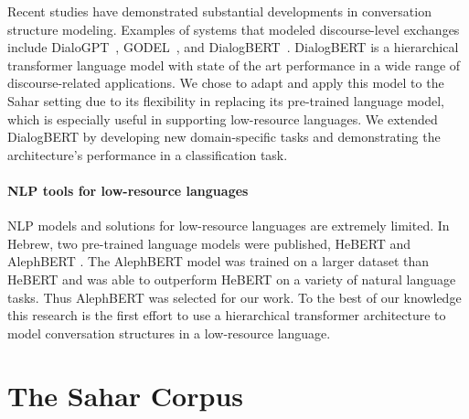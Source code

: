 \documentclass[letterpaper]{article} %
\begin{document}


Recent studies have  demonstrated substantial developments in  conversation structure modeling. Examples of systems that modeled discourse-level exchanges include DialoGPT~\cite{zhang2019dialogpt}, GODEL~\cite{peng2022godel}, and DialogBERT~\cite{gu2021dialogbert}.
DialogBERT is a hierarchical transformer language  model  with state of the art performance in a wide range of discourse-related applications. We chose to adapt and apply this model to the Sahar setting  due to its flexibility in replacing its pre-trained language model, which is especially useful in supporting low-resource languages. We extended DialogBERT by developing new domain-specific tasks and demonstrating the architecture's performance in a classification task.
 

\paragraph{NLP tools for low-resource languages}
NLP models and solutions for low-resource languages are extremely limited. 
In Hebrew, two pre-trained language models were published, HeBERT\cite{chriquiHeBERTHebEMOHebrew2021} and AlephBERT \cite{seker2022alephbert}. The AlephBERT model was trained on a larger dataset than HeBERT and was able to outperform HeBERT on a variety of natural language tasks. Thus AlephBERT was selected for our work. To the best of our knowledge this research is the first effort to use a hierarchical transformer architecture to model conversation structures in a low-resource language.

\section{The Sahar Corpus}
\end{document}
